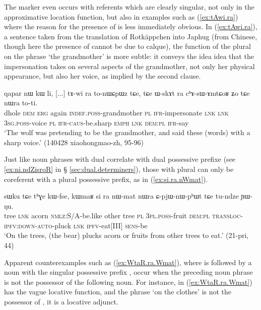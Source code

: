 The marker  even occurs with referents which are clearly singular, not only in the approximative location function, but also in examples such as (\ref{ex:tAwi.ra}) where the reason for the presence of  is less immediately obvious. In (\ref{ex:tAwi.ra}), a sentence taken from the translation of Rotkäppchen into Japhug (from Chinese, though here the presence of  cannot be due to calque), the function of the plural on the phrase  `the grandmother' is more subtle: it conveys the idea idea that the impersonation takes on several aspects of the grandmother, not only her physical appearance, but also her voice, as implied by the second clause. 

\begin{exe}
\ex \label{ex:tAwi.ra}
\gll  qapar nɯ kɯ li, [...] tɤ-wi ra to-nɯɕpɯz tɕe, tɕe ɯ-skɤt ra cʰɤ-sɯ-ɤmtɕoʁ ʑo tɕe nɯra to-ti. \\
dhole \textsc{dem} \textsc{erg} again { } \textsc{indef}.\textsc{poss}-grandmother \textsc{pl} \textsc{ifr}-impersonate \textsc{lnk} \textsc{lnk} \textsc{3sg}.\textsc{poss}-voice \textsc{pl} \textsc{ifr}-\textsc{caus}-be.sharp \textsc{emph} \textsc{lnk} \textsc{dem}:\textsc{pl} \textsc{ifr}-say \\
\glt `The wolf was pretending to be the grandmother, and said these (words) with a sharp voice.' (140428 xiaohongmao-zh, 95-96)
\end{exe} 

Just like noun phrases with dual  correlate with dual possessive prefixe (see \ref{ex:ni.ndZisroR} in § \ref{sec:dual.determiners}), those with plural  can only be coreferent with a plural possessive prefix, as  in (\ref{ex:si.ra.nWmat}).

\begin{exe}
\ex \label{ex:si.ra.nWmat}
 \gll  sɯku tɕe tʰɣe kɯ-fse, kɯmaʁ si ra nɯ-mat nɯra ɕ-pjɯ-nɯ-pʰɯt tɕe tu-ndze ɲɯ-ŋu.\\
tree \textsc{lnk} acorn \textsc{nmlz}:S/A-be.like other tree \textsc{pl} \textsc{3pl}.\textsc{poss}-fruit \textsc{dem}:\textsc{pl} \textsc{transloc}-\textsc{ipfv}:\textsc{down}-\textsc{auto}-pluck \textsc{lnk} \textsc{ipfv}-eat[III] \textsc{sens}-be \\
\glt `On the trees, (the bear) plucks acorn or fruits from other trees to eat.' (21-pri, 44)
\end{exe}

Apparent counterexamples such as (\ref{ex:WtaR.ra.Wmat}), where  is followed by a noun with the singular possessive prefix , occur when the preceding noun phrase is not the possessor of the following noun. For instance, in (\ref{ex:WtaR.ra.Wmat})  has the vague locative function, and the phrase  `on the clothes' is not the possessor of , it is a locative adjunct.

